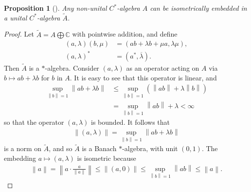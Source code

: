 \documentclass[11pt,a4paper]{report}
\theoremstyle{plain}
\newtheorem*{prop*}{Proposition}
\theoremstyle{definition}
\newcommand{\1}{\mathbbm{1}}
\newcommand{\C}{\mathbb{C}}
\renewcommand{\oplus}{\textstyle\bigoplus}
\begin{document}
\begin{prop*}[{\cite[I.1.3]{davidson96}}]
	Any non-unital $C^\ast$-algebra $A$ can be isometrically embedded in a unital 
	$C^\ast$-algebra $\tilde{A}$.

\end{prop*}
\begin{proof}
	Let $\tilde{A} = A \oplus \C$ with pointwise addition, and define
	\begin{align*}
		(a,\lambda) (b,\mu) &= (ab+\lambda b + \mu a, \lambda \mu),								\\
		(a,\lambda)^\ast &= (a^\ast,\overline{\lambda}).
	\end{align*}
	Then $\tilde{A}$ is a $\ast$-algebra. 
	Consider $(a,\lambda)$ as an operator acting on $A$ via $b\mapsto ab+\lambda b$ 
	for $b$ in $A$. It is easy to see that this operator is linear, and 
	\begin{align*}
				\sup_{\left\|b\right\|=1}\left\|ab+\lambda b\right\| 
		&\leq 	\sup_{\left\|b\right\|=1} (\left\|ab\right\|+ \lambda\left\|b\right\|)			\\
		&=		\sup_{\left\|b\right\|=1} \left\|ab\right\|+ \lambda < \infty
	\end{align*}
	so that the operator $(a,\lambda)$ is bounded. It follows that
	\begin{align*}
		\left\|(a,\lambda)\right\| = \sup_{\left\|b\right\|=1}\left\|ab+\lambda b\right\|
	\end{align*}
	is a norm on $\tilde{A}$, and so $\tilde{A}$ is a Banach $\ast$-algebra, with unit $(0,1)$.
	The embedding $a\mapsto(a,\lambda)$ is isometric because 
	\begin{align*}
		\left\|a\right\| = \left\|a\cdot\frac{a}{\left\|a\right\|}\right\| 
						 \leq \left\|(a,0)\right\| 
						 \leq \sup_{\left\|b\right\|=1}{\left\|ab\right\|} 
						 \leq \left\|a\right\|.
	\end{align*}
	

\end{proof}
\end{document}
